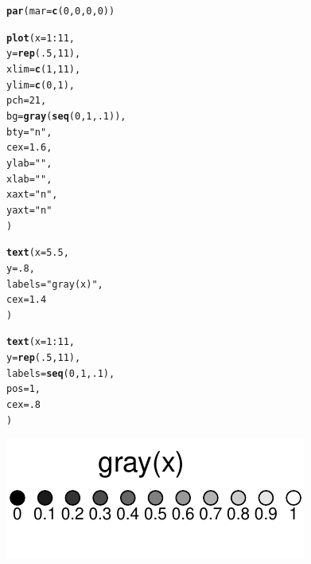 \documentclass{tufte-book}\usepackage[]{graphicx}\usepackage[]{color}
\makeatletter
\def\maxwidth{ %
  \ifdim\Gin@nat@width>\linewidth
    \linewidth
  \else
    \Gin@nat@width
  \fi
}
\newcommand{\hlnum}[1]{\textcolor[rgb]{0.686,0.059,0.569}{#1}}%
\newcommand{\hlstr}[1]{\textcolor[rgb]{0.192,0.494,0.8}{#1}}%
\newcommand{\hlopt}[1]{\textcolor[rgb]{0,0,0}{#1}}%
\newcommand{\hlstd}[1]{\textcolor[rgb]{0.345,0.345,0.345}{#1}}%
\newcommand{\hlkwc}[1]{\textcolor[rgb]{0.333,0.667,0.333}{#1}}%
\newcommand{\hlkwd}[1]{\textcolor[rgb]{0.737,0.353,0.396}{\textbf{#1}}}%
\newenvironment{kframe}{%
 \def\at@end@of@kframe{}%
 \ifinner\ifhmode%
  \def\at@end@of@kframe{\end{minipage}}%
  \begin{minipage}{\columnwidth}%
 \fi\fi%
 \def\FrameCommand##1{\hskip\@totalleftmargin \hskip-\fboxsep
 \colorbox{shadecolor}{##1}\hskip-\fboxsep
     \hskip-\linewidth \hskip-\@totalleftmargin \hskip\columnwidth}%
 \MakeFramed {\advance\hsize-\width
   \@totalleftmargin\z@ \linewidth\hsize
   \@setminipage}}%
 {\par\unskip\endMakeFramed%
 \at@end@of@kframe}
\newenvironment{knitrout}{}{} %
\makeatother
\begin{document}
\begin{marginfigure}
\begin{footnotesize}
\begin{knitrout}
\color{fgcolor}\begin{kframe}
\begin{alltt}
\hlkwd{par}\hlstd{(}\hlkwc{mar} \hlstd{=} \hlkwd{c}\hlstd{(}\hlnum{0}\hlstd{,} \hlnum{0}\hlstd{,} \hlnum{0}\hlstd{,} \hlnum{0}\hlstd{))}

\hlkwd{plot}\hlstd{(}\hlkwc{x} \hlstd{=} \hlnum{1}\hlopt{:}\hlnum{11}\hlstd{,}
     \hlkwc{y} \hlstd{=} \hlkwd{rep}\hlstd{(}\hlnum{.5}\hlstd{,} \hlnum{11}\hlstd{),}
     \hlkwc{xlim} \hlstd{=} \hlkwd{c}\hlstd{(}\hlnum{1}\hlstd{,} \hlnum{11}\hlstd{),}
     \hlkwc{ylim} \hlstd{=} \hlkwd{c}\hlstd{(}\hlnum{0}\hlstd{,} \hlnum{1}\hlstd{),}
     \hlkwc{pch} \hlstd{=} \hlnum{21}\hlstd{,}
     \hlkwc{bg} \hlstd{=} \hlkwd{gray}\hlstd{(}\hlkwd{seq}\hlstd{(}\hlnum{0}\hlstd{,} \hlnum{1}\hlstd{,} \hlnum{.1}\hlstd{)),}
     \hlkwc{bty} \hlstd{=} \hlstr{"n"}\hlstd{,}
     \hlkwc{cex} \hlstd{=} \hlnum{1.6}\hlstd{,}
     \hlkwc{ylab} \hlstd{=} \hlstr{""}\hlstd{,}
     \hlkwc{xlab} \hlstd{=} \hlstr{""}\hlstd{,}
     \hlkwc{xaxt} \hlstd{=} \hlstr{"n"}\hlstd{,}
     \hlkwc{yaxt} \hlstd{=} \hlstr{"n"}
     \hlstd{)}

\hlkwd{text}\hlstd{(}\hlkwc{x} \hlstd{=} \hlnum{5.5}\hlstd{,}
     \hlkwc{y} \hlstd{=} \hlnum{.8}\hlstd{,}
     \hlkwc{labels} \hlstd{=} \hlstr{"gray(x)"}\hlstd{,}
     \hlkwc{cex} \hlstd{=} \hlnum{1.4}
     \hlstd{)}

\hlkwd{text}\hlstd{(}\hlkwc{x} \hlstd{=} \hlnum{1}\hlopt{:}\hlnum{11}\hlstd{,}
     \hlkwc{y} \hlstd{=} \hlkwd{rep}\hlstd{(}\hlnum{.5}\hlstd{,} \hlnum{11}\hlstd{),}
     \hlkwc{labels} \hlstd{=} \hlkwd{seq}\hlstd{(}\hlnum{0}\hlstd{,} \hlnum{1}\hlstd{,} \hlnum{.1}\hlstd{),}
     \hlkwc{pos} \hlstd{=} \hlnum{1}\hlstd{,}
     \hlkwc{cex} \hlstd{=} \hlnum{.8}
     \hlstd{)}
\end{alltt}
\end{kframe}
\includegraphics[width=\maxwidth]{figure/unnamed-chunk-190-1} 

\end{knitrout}
\end{footnotesize}
\end{marginfigure}
\end{document}
